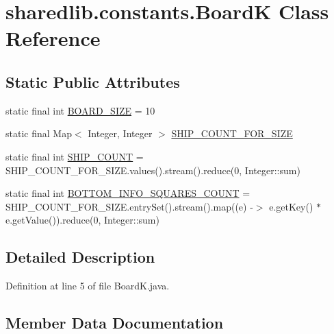 \hypertarget{classsharedlib_1_1constants_1_1_board_k}{}\section{sharedlib.\+constants.\+BoardK Class Reference}
\label{classsharedlib_1_1constants_1_1_board_k}
\subsection*{Static Public Attributes}
\begin{DoxyCompactItemize}
\item 
static final int \hyperlink{classsharedlib_1_1constants_1_1_board_k_ae6b76f4ea6d62b97650e14cd953f41f0}{B\+O\+A\+R\+D\+\_\+\+S\+I\+ZE} = 10
\item 
static final Map$<$ Integer, Integer $>$ \hyperlink{classsharedlib_1_1constants_1_1_board_k_a53904d51affb4ad3b367258585c91f70}{S\+H\+I\+P\+\_\+\+C\+O\+U\+N\+T\+\_\+\+F\+O\+R\+\_\+\+S\+I\+ZE}
\item 
static final int \hyperlink{classsharedlib_1_1constants_1_1_board_k_a7b90dc391ec795dbaac068c611dd9787}{S\+H\+I\+P\+\_\+\+C\+O\+U\+NT} = S\+H\+I\+P\+\_\+\+C\+O\+U\+N\+T\+\_\+\+F\+O\+R\+\_\+\+S\+I\+Z\+E.\+values().stream().reduce(0, Integer\+::sum)
\item 
static final int \hyperlink{classsharedlib_1_1constants_1_1_board_k_a8d50e08738e1f560369f120ab7d66a31}{B\+O\+T\+T\+O\+M\+\_\+\+I\+N\+F\+O\+\_\+\+S\+Q\+U\+A\+R\+E\+S\+\_\+\+C\+O\+U\+NT} = S\+H\+I\+P\+\_\+\+C\+O\+U\+N\+T\+\_\+\+F\+O\+R\+\_\+\+S\+I\+Z\+E.\+entry\+Set().stream().map((e) -\/$>$ e.\+get\+Key() $\ast$ e.\+get\+Value()).reduce(0, Integer\+::sum)
\end{DoxyCompactItemize}


\subsection{Detailed Description}


Definition at line 5 of file Board\+K.\+java.



\subsection{Member Data Documentation}
\hypertarget{classsharedlib_1_1constants_1_1_board_k_ae6b76f4ea6d62b97650e14cd953f41f0}{}\label{classsharedlib_1_1constants_1_1_board_k_ae6b76f4ea6d62b97650e14cd953f41f0} 
